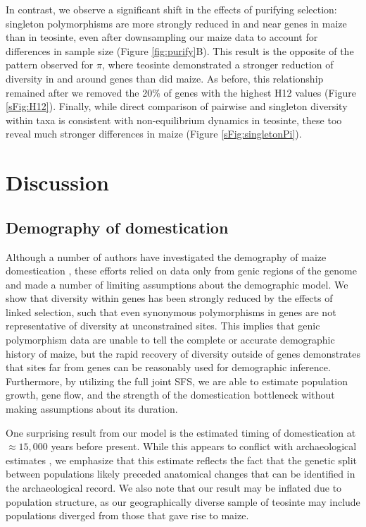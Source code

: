 \documentclass{pnastwo}
\begin{document}
\begin{article}
In contrast, we observe a significant shift in the effects of purifying selection: singleton polymorphisms are more strongly reduced in and near genes in maize than in teosinte, even after downsampling our maize data to account for differences in sample size (Figure \ref{fig:purify}B). 
This result is the opposite of the pattern observed for $\pi$, where teosinte demonstrated a stronger reduction of diversity in and around genes than did maize. 
As before, this relationship remained after we removed the 20\% of genes with the highest H12 values (Figure \ref{sFig:H12}).
Finally, while direct comparison of pairwise and singleton diversity within taxa is consistent with   non-equilibrium dynamics in teosinte, these too reveal much stronger differences in maize (Figure \ref{sFig:singletonPi}).



\section{Discussion}


\subsection{Demography of domestication} %
Although a number of authors have investigated the demography of maize domestication \cite{eyre1998, tenaillon2004, wright2005}, these  efforts relied on data only from genic regions of the genome and made a number of limiting assumptions about the demographic model.  We show that diversity within genes has been strongly reduced by the effects of linked selection, such that even synonymous polymorphisms in genes are not representative of diversity at unconstrained sites. This implies that genic polymorphism data are unable to tell the complete or accurate demographic history of maize, but the rapid recovery of diversity outside of genes demonstrates that sites far from genes can be reasonably used for demographic inference. Furthermore, by utilizing the full joint SFS, we are able to estimate population growth, gene flow, and the strength of the domestication bottleneck without making assumptions about its duration.  

One surprising result from our model is the estimated timing of domestication at $\approx 15,000$ years before present.
While this appears to conflict with archaeological estimates \cite{piperno2009}, we emphasize that this estimate reflects the fact that the genetic split between populations likely preceded anatomical changes that can be identified in the archaeological record. 
We also note that our result may be inflated due to population structure, as our geographically diverse sample of teosinte may include populations diverged from those that gave rise to maize.


\end{article}
\end{document}
